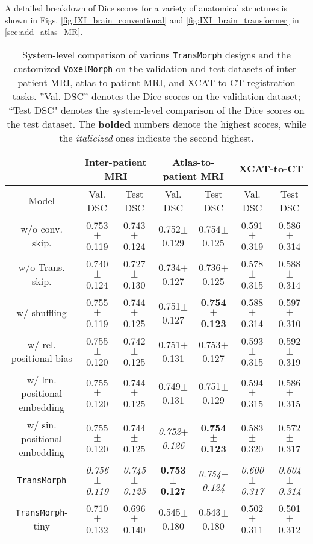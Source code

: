 \documentclass[times,twocolumn,final]{elsarticle}
\begin{document}
A detailed breakdown of Dice scores for a variety of anatomical structures is shown in Figs. \ref{fig:IXI_brain_conventional} and \ref{fig:IXI_brain_transformer} in \ref{sec:add_atlas_MR}.
\begin{table*}[!t]
\fontsize{10}{11}\selectfont
\caption{System-level comparison of various \texttt{TransMorph} designs and the customized \texttt{VoxelMorph} on the validation and test datasets of inter-patient MRI, atlas-to-patient MRI, and XCAT-to-CT registration tasks. ”Val. DSC” denotes the Dice scores on the validation dataset; ``Test DSC" denotes the system-level comparison of the Dice scores on the test dataset. The \textbf{bolded} numbers denote the highest scores, while the \textit{italicized} ones indicate the second highest.}
\centering
    \begin{tabular}{ c || c | c | c | c | c | c }
 \hline
  & \multicolumn{2}{c|}{Inter-patient MRI} & \multicolumn{2}{c|}{Atlas-to-patient MRI} & \multicolumn{2}{c}{XCAT-to-CT} \\
 \hline
 Model & Val. DSC & Test DSC & Val. DSC & Test DSC & Val. DSC & Test DSC\\
 \hline
 w/o conv. skip.& 0.753$\pm$0.119 & 0.743$\pm$0.124 & 0.752$\pm$0.129 & 0.754$\pm$0.125 & 0.591$\pm$0.319 & 0.586$\pm$0.314\\
 \hline
 w/o Trans. skip. & 0.740$\pm$0.124 & 0.727$\pm$0.130  & 0.734$\pm$0.127 & 0.736$\pm$0.125 & 0.578$\pm$0.315 & 0.588$\pm$0.314\\
 \hline
 w/ shuffling & 0.755$\pm$0.119 & 0.744$\pm$0.125 & 0.751$\pm$0.127 & \textbf{0.754$\pm$0.123} & 0.588$\pm$0.314 & 0.597$\pm$0.310\\
 \hline
 w/ rel. positional bias & 0.755$\pm$0.120 & 0.742$\pm$0.125& 0.751$\pm$0.131 & 0.753$\pm$0.127 & 0.593$\pm$0.315 & 0.592$\pm$0.319\\
 \hline
 w/ lrn. positional embedding & 0.755$\pm$0.120 & 0.744$\pm$0.125 & 0.749$\pm$0.131 & 0.751$\pm$0.129 & 0.594$\pm$0.315 & 0.586$\pm$0.315\\
 \hline
 w/ sin. positional embedding & 0.755$\pm$0.120 & 0.744$\pm$0.125  & \textit{0.752$\pm$0.126} & \textbf{0.754$\pm$0.123} & 0.583$\pm$0.320 & 0.572$\pm$0.317\\
 \hline
 \hline
 \texttt{TransMorph}& \textit{0.756$\pm$0.119} & \textit{0.745$\pm$0.125}& \textbf{0.753$\pm$0.127} & \textit{0.754$\pm$0.124} & \textit{0.600$\pm$0.317} & \textit{0.604$\pm$0.314}\\
 \hline
 \texttt{TransMorph}-tiny & 0.710$\pm$0.132 & 0.696$\pm$0.140 &0.545$\pm$0.180 & 0.543$\pm$0.180 & 0.502$\pm$0.311 & 0.501$\pm$0.312\\

\end{tabular}
\end{table*}
\end{document}
